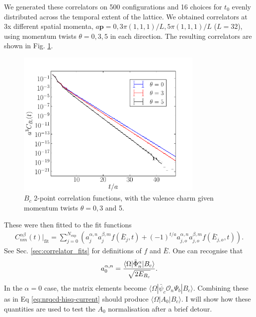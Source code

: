We generated these correlators on 500 configurations and 16 choices for $t_0$ evenly distributed across the temporal extent of the lattice. We obtained correlators at 3x different spatial momenta, $a\textbf{p} = 0, 3\pi(1,1,1)/L, 5\pi(1,1,1)/L$ ($L=32$), using momentum twists $\theta=0,3,5$ in each direction. The resulting correlators are shown in Fig. \ref{fig:Bccorrs}.

\begin{figure}[htp!]
  \begin{center}
    \includegraphics[width=0.80\textwidth]{images/nrqcd/Bc_correlators.pdf}
  \end{center}
  \caption{$B_c$ 2-point correlation functions, with the valence charm given momentum twists $\theta=0,3$ and 5. \label{fig:Bccorrs}}
\end{figure}

These were then fitted to the fit functions 
\begin{align}
  C^{\alpha\beta}_{nm}(t)|_{\text{fit}} = \sum_{j=0}^{N_{\text{exp}}} \left( a^{\alpha,n}_j a^{\beta,m}_j f(\bar{E}_j,t) + (-1)^{t/a} a^{\alpha,n}_{j,o} a^{\beta,m}_{j,o} f(\bar{E}_{j,o},t) \right).
  \label{eq:2ptfit_wsmears}
\end{align}
See Sec. \ref{sec:correlator_fits} for definitions of $f$ and $\bar{E}$. One can recognise that
\begin{align}
  a_0^{\alpha,n} = {\langle \Omega | \tilde{\Phi}^{\alpha}_n | B_c \rangle \over \sqrt{2 E_{B_c}}}.
\end{align}
In the $\alpha=0$ case, the matrix elements become $\langle \Omega | \bar{\psi}_c \mathcal{O}_n \Psi_b | B_c \rangle$. Combining these as in Eq \eqref{eq:nrqcd-hisq-current} should produce $\langle \Omega | A_0 | B_c \rangle$. I will show how these quantities are used to test the $A_0$ normalisation after a brief detour.

